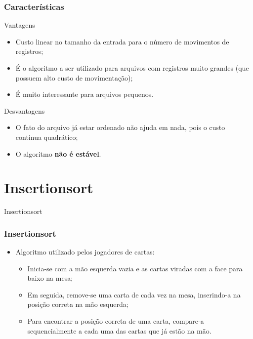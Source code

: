 \documentclass[aspectratio=169]{beamer}
\begin{document}


\begin{frame}
\frametitle{Características}
\begin{block}{Vantagens}
  \begin{itemize}
  \item Custo linear no tamanho da entrada para o número de movimentos de registros;
  \item É o algoritmo a ser utilizado para arquivos com registros muito grandes (que possuem alto custo de movimentação);
  \item É muito interessante para arquivos pequenos.
  \end{itemize}
\end{block}
\begin{block}{Desvantagens}
  \begin{itemize}
  \item O fato do arquivo já estar ordenado não ajuda em nada, pois o custo continua quadrático;
  \item O algoritmo {\bf não é estável}.
  \end{itemize} 
\end{block}
\end{frame}

\section{Insertionsort}


\begin{frame}
\Huge{\centerline{Insertionsort}}
\end{frame}

\begin{frame}
\frametitle{Insertionsort}
\begin{itemize}
\item Algoritmo utilizado pelos jogadores de cartas:
    \begin{itemize}
      \item Inicia-se com a mão esquerda vazia e as cartas viradas com a face para baixo na mesa;
      \item Em seguida, remove-se uma carta de cada vez na mesa, inserindo-a na posição correta na mão esquerda;
      \item Para encontrar a posição correta de uma carta, compare-a sequencialmente a cada uma das cartas que já estão na mão.
      \end{itemize}      
\end{itemize}
\end{frame}
\end{document}
